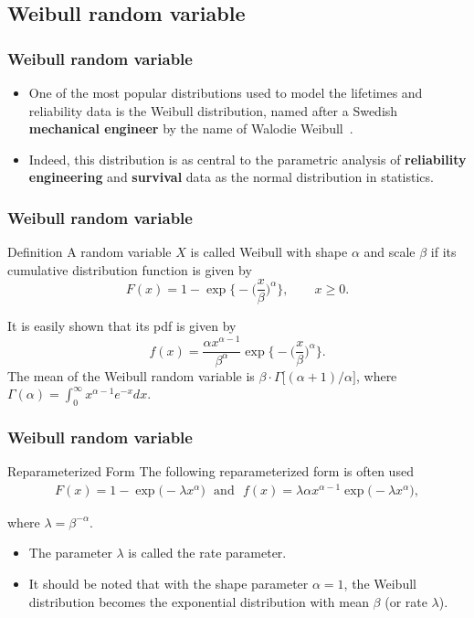 \subsection{Weibull random variable}

\begin{frame}
\frametitle{Weibull random variable}
\begin{itemize}
\item One of the most popular distributions used to model the lifetimes and reliability data
is the Weibull distribution, named after a Swedish \textbf{mechanical engineer} by the name of
Walodie Weibull~\citeyear{Weibull:1939}.
\item Indeed, this distribution is as central to the parametric analysis of 
\textbf{reliability engineering} and \textbf{survival} data as the normal distribution in statistics.
\end{itemize}
\end{frame}

\begin{frame}
\frametitle{Weibull random variable}
\begin{block}{Definition}
A random variable $X$ is called \textsf{Weibull} with shape $\alpha$
and scale $\beta$
if its cumulative distribution function is given by
$$
F(x) = 1 - \exp\Big\{ - \big( \frac{x}{\beta} \big)^{\alpha}   \Big\},
\qquad x \ge 0.
$$
\end{block}
It is easily shown that its pdf is given by
$$
f(x) =  \frac{\alpha x^{\alpha-1}}{\beta^\alpha} 
        \exp\Big\{ - \big( \frac{x}{\beta} \big)^{\alpha} \Big\}.
$$
The mean of the Weibull random variable is
$\beta\cdot\Gamma\big[ (\alpha+1)/\alpha \big]$, where
$\Gamma(\alpha)=\int_0^{\infty} x^{\alpha-1} e^{-x} dx$.
\end{frame}

\begin{frame}
\frametitle{Weibull random variable}
\begin{block}{Reparameterized Form}
The following reparameterized form is often used
\begin{align*}
F(x) = 1 - \exp\big( - \lambda x^{\alpha}  \big)  \textrm{~~and~~} 
f(x) = \lambda\alpha x^{\alpha-1} \exp\big( - \lambda x^{\alpha}  \big),
\end{align*}
\end{block}
where $\lambda=\beta^{-\alpha}$. 
\begin{itemize}
\item The parameter $\lambda$ is called the \textsf{rate parameter}.
\item It should be noted that with the shape parameter $\alpha=1$, the Weibull distribution
becomes the exponential distribution
with mean $\beta$ (or rate $\lambda$).
\end{itemize}
\end{frame}


